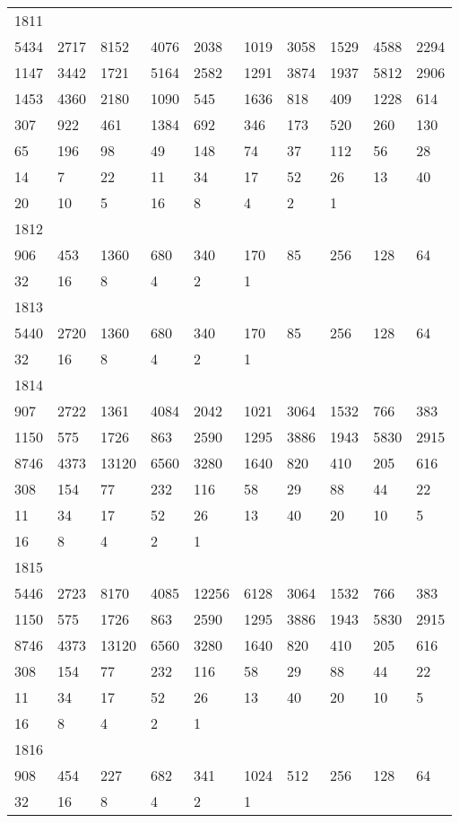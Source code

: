 \begin{longtable}{*{10}{l}}
1811&&&&&&&&&\\
5434& 2717& 8152& 4076& 2038& 1019& 3058& 1529& 4588& 2294\\
1147& 3442& 1721& 5164& 2582& 1291& 3874& 1937& 5812& 2906\\
1453& 4360& 2180& 1090& 545& 1636& 818& 409& 1228& 614\\
307& 922& 461& 1384& 692& 346& 173& 520& 260& 130\\
65& 196& 98& 49& 148& 74& 37& 112& 56& 28\\
14& 7& 22& 11& 34& 17& 52& 26& 13& 40\\
20& 10& 5& 16& 8& 4& 2& 1& \\

1812&&&&&&&&&\\
906& 453& 1360& 680& 340& 170& 85& 256& 128& 64\\
32& 16& 8& 4& 2& 1& \\

1813&&&&&&&&&\\
5440& 2720& 1360& 680& 340& 170& 85& 256& 128& 64\\
32& 16& 8& 4& 2& 1& \\

1814&&&&&&&&&\\
907& 2722& 1361& 4084& 2042& 1021& 3064& 1532& 766& 383\\
1150& 575& 1726& 863& 2590& 1295& 3886& 1943& 5830& 2915\\
8746& 4373& 13120& 6560& 3280& 1640& 820& 410& 205& 616\\
308& 154& 77& 232& 116& 58& 29& 88& 44& 22\\
11& 34& 17& 52& 26& 13& 40& 20& 10& 5\\
16& 8& 4& 2& 1& \\

1815&&&&&&&&&\\
5446& 2723& 8170& 4085& 12256& 6128& 3064& 1532& 766& 383\\
1150& 575& 1726& 863& 2590& 1295& 3886& 1943& 5830& 2915\\
8746& 4373& 13120& 6560& 3280& 1640& 820& 410& 205& 616\\
308& 154& 77& 232& 116& 58& 29& 88& 44& 22\\
11& 34& 17& 52& 26& 13& 40& 20& 10& 5\\
16& 8& 4& 2& 1& \\

1816&&&&&&&&&\\
908& 454& 227& 682& 341& 1024& 512& 256& 128& 64\\
32& 16& 8& 4& 2& 1& \\


\end{longtable}

